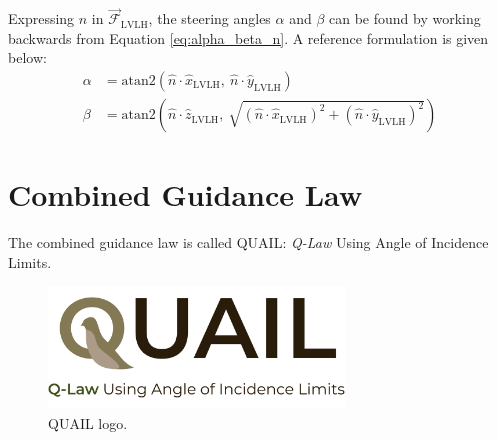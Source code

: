 Expressing $\hat{n}$ in $\vec{\mathcal{F}}_{\text{LVLH}}$, the steering angles $\alpha$ and $\beta$ can be found by working backwards from Equation \ref{eq:alpha_beta_n}. A reference formulation is given below:
\begin{align*}
  \alpha & = \mathrm{atan2}\left(\hat{n} \cdot \hat{x}_{\text{LVLH}}, \ \hat{n} \cdot \hat{y}_{\text{LVLH}}\right)                                                      \\
  \beta  & = \mathrm{atan2}\left(\hat{n} \cdot \hat{z}_{\text{LVLH}}, \ \sqrt{(\hat{n} \cdot \hat{x}_{\text{LVLH}})^2 + (\hat{n} \cdot \hat{y}_{\text{LVLH}})^2}\right)
\end{align*}

\section{Combined Guidance Law}
The combined guidance law is called QUAIL: \textit{Q-Law} Using Angle of Incidence Limits.

\begin{figure}[H]
  \centering
  \includegraphics[width=0.7\textwidth]{figures/quail_logo_v2.pdf}
  \caption{QUAIL logo.}
  \label{fig:quail_logo}
\end{figure}


